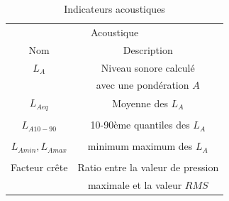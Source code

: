 \begin{table}[t]
\centering
\begin{tabular}{c c} 
\multicolumn{2}{c}{Acoustique} \\ 
Nom                           & Description            \\                                                            
\hline
$L_{A}$                                   & Niveau sonore calculé      \\
                                          & avec une pondération $A$\\
$L_{Aeq}$                                 & Moyenne des $L_A$     \\
                                          &         \\
$L_{A10-90}$                              & 10-90ème quantiles des $L_A$     \\
                                          &         \\
$L_{Amin}, L_{Amax}$                      & minimum maximum des $L_A$    \\
                                          &         \\
Facteur crête                             & Ratio entre la valeur de pression     \\
                                          & maximale et la valeur $RMS$        \\                                          
\hline
\end{tabular}
\vspace{0.5mm}
\caption{ Indicateurs acoustiques}
\label{tab:acousIndi}
\end{table}

